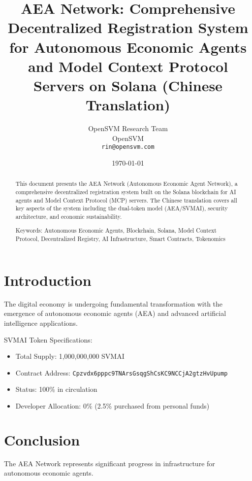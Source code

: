 \documentclass[12pt,a4paper]{article}
\title{AEA Network: Comprehensive Decentralized Registration System for Autonomous Economic Agents and Model Context Protocol Servers on Solana (Chinese Translation)}
\author{OpenSVM Research Team \\ OpenSVM \\ \texttt{rin@opensvm.com}}
\date{\today}
\begin{document}
\maketitle

\begin{abstract}
This document presents the AEA Network (Autonomous Economic Agent Network), a comprehensive decentralized registration system built on the Solana blockchain for AI agents and Model Context Protocol (MCP) servers. The Chinese translation covers all key aspects of the system including the dual-token model (AEA/SVMAI), security architecture, and economic sustainability.

Keywords: Autonomous Economic Agents, Blockchain, Solana, Model Context Protocol, Decentralized Registry, AI Infrastructure, Smart Contracts, Tokenomics
\end{abstract}

\section{Introduction}
The digital economy is undergoing fundamental transformation with the emergence of autonomous economic agents (AEA) and advanced artificial intelligence applications.

SVMAI Token Specifications:
\begin{itemize}
\item Total Supply: 1,000,000,000 SVMAI
\item Contract Address: \texttt{Cpzvdx6pppc9TNArsGsqgShCsKC9NCCjA2gtzHvUpump}
\item Status: 100\% in circulation
\item Developer Allocation: 0\% (2.5\% purchased from personal funds)
\end{itemize}

\section{Conclusion}
The AEA Network represents significant progress in infrastructure for autonomous economic agents.
\end{document}
